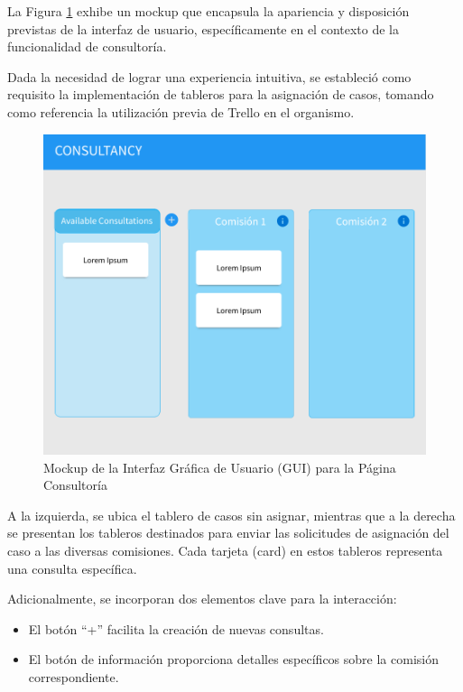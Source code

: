 La Figura \ref{fig:gui-consultancy} exhibe un mockup que encapsula la apariencia y disposición previstas de la interfaz de usuario, específicamente en el contexto de la funcionalidad de consultoría.

Dada la necesidad de lograr una experiencia intuitiva, se estableció como requisito la implementación de tableros para la asignación de casos, tomando como referencia la utilización previa de Trello en el organismo.

\begin{figure}[h]
\centering
\includegraphics[width=1\linewidth]{fig/GUI-consultancy.png}
\caption{Mockup de la Interfaz Gráfica de Usuario (GUI) para la Página Consultoría}
\label{fig:gui-consultancy}
\end{figure}


A la izquierda, se ubica el tablero de casos sin asignar, mientras que a la derecha se presentan los tableros destinados para enviar las solicitudes de asignación del caso a las diversas comisiones. Cada tarjeta (card) en estos tableros representa una consulta específica.

Adicionalmente, se incorporan dos elementos clave para la interacción:
\begin{itemize}
    \item El botón ``+''  facilita la creación de nuevas consultas.
    \item El botón de información proporciona detalles específicos sobre la comisión correspondiente.
\end{itemize}



